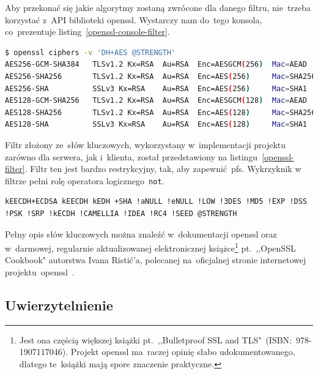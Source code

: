 \documentclass[thesis]{subfiles}
\begin{document}
Aby przekonać się jakie algorytmy zostaną zwrócone dla danego filtru, nie~trzeba korzystać z~API biblioteki \gls{openssl}. Wystarczy nam do~tego konsola, co~prezentuje listing~\ref{openssl-console-filter}.\\

\begin{lstlisting}[numbers=none,language=bash,caption={Wynik filtrowania zestawów algorytmów w~konsoli za~pomocą \gls{openssl}},label=openssl-console-filter]
$ openssl ciphers -v 'DH+AES @STRENGTH'
AES256-GCM-SHA384   TLSv1.2 Kx=RSA  Au=RSA  Enc=AESGCM(256)  Mac=AEAD
AES256-SHA256       TLSv1.2 Kx=RSA  Au=RSA  Enc=AES(256)     Mac=SHA256
AES256-SHA          SSLv3 Kx=RSA    Au=RSA  Enc=AES(256)     Mac=SHA1
AES128-GCM-SHA256   TLSv1.2 Kx=RSA  Au=RSA  Enc=AESGCM(128)  Mac=AEAD
AES128-SHA256       TLSv1.2 Kx=RSA  Au=RSA  Enc=AES(128)     Mac=SHA256
AES128-SHA          SSLv3 Kx=RSA    Au=RSA  Enc=AES(128)     Mac=SHA1
\end{lstlisting}

Filtr złożony ze~słów kluczowych, wykorzystany w~implementacji projektu zarówno dla serwera, jak i~klienta, został przedstawiony na listingu~\ref{openssl-filter}. Filtr ten jest bardzo restrykcyjny, tak, aby zapewnić~\gls{pfs}. Wykrzyknik w filtrze pełni rolę operatora logicznego~\texttt{not}.\\

\begin{lstlisting}[numbers=none,caption={Filtr \gls{openssl} dla algorytmów użytych w~projekcie},label=openssl-filter]
kEECDH+ECDSA kEECDH kEDH +SHA !aNULL !eNULL !LOW !3DES !MD5 !EXP !DSS !PSK !SRP !kECDH !CAMELLIA !IDEA !RC4 !SEED @STRENGTH
\end{lstlisting}

Pełny opis słów kluczowych można znaleźć w~dokumentacji \gls{openssl} oraz w~darmowej, regularnie aktualizowanej elektronicznej książce\footnote{Jest ona częścią większej książki pt.~,,Bulletproof SSL and TLS"~(ISBN:~978-1907117046). Projekt \gls{openssl} ma~raczej opinię słabo udokumentowanego, dlatego te~książki mają spore znaczenie praktyczne.} pt.~,,OpenSSL Cookbook" autorstwa Ivana Ristić'a, polecanej na~oficjalnej stronie internetowej projektu~\gls{openssl}~\cite{openssl-cookbook-suites}.


\subsection{Uwierzytelnienie}
\end{document}
